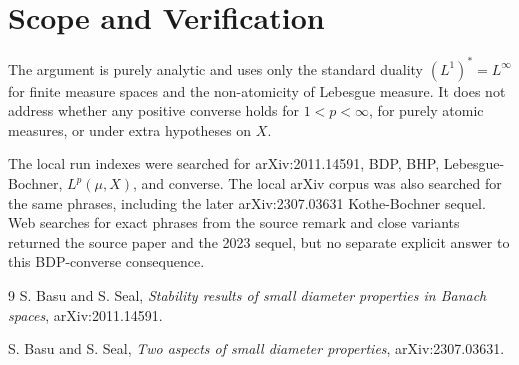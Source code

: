 \documentclass[11pt]{article}
\begin{document}
\section*{Scope and Verification}

The argument is purely analytic and uses only the standard duality
\((L^1)^*=L^\infty\) for finite measure spaces and the non-atomicity of
Lebesgue measure.  It does not address whether any positive converse holds
for \(1<p<\infty\), for purely atomic measures, or under extra hypotheses on
\(X\).

The local run indexes were searched for arXiv:2011.14591, BDP, BHP,
Lebesgue-Bochner, \(L^p(\mu,X)\), and converse.  The local arXiv corpus was
also searched for the same phrases, including the later arXiv:2307.03631
Kothe-Bochner sequel.  Web searches for exact phrases from the source remark
and close variants returned the source paper and the 2023 sequel, but no
separate explicit answer to this BDP-converse consequence.

\begin{thebibliography}{9}
S. Basu and S. Seal,
\emph{Stability results of small diameter properties in Banach spaces},
arXiv:2011.14591.

S. Basu and S. Seal,
\emph{Two aspects of small diameter properties},
arXiv:2307.03631.
\end{thebibliography}
\end{document}
